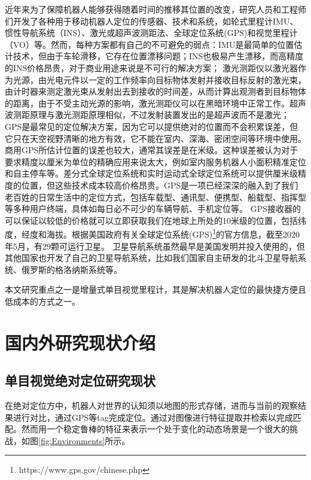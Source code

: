 近年来为了保障机器人能够获得随着时间的推移其位置的改变，研究人员和工程师们开发了各种用于移动机器人定位的传感器、技术和系统，如轮式里程计IMU、惯性导航系统（INS）、激光或超声波测距法、全球定位系统(GPS)和视觉里程计（VO）等。然而，每种方案都有自己的不可避免的弱点：IMU是最简单的位置估计技术，但由于车轮滑移，它存在位置漂移问题\cite{2005Visual}；INS也极易产生漂移，而高精度的INS价格昂贵，对于商业用途来说是不可行的解决方案；
激光测距仪以激光器作为光源，由光电元件以一定的工作频率向目标物体发射并接收目标反射的激光束，由计时器来测定激光束从发射出去到接收的时间差，从而计算出观测者到目标物体的距离，由于不受主动光源的影响，激光测距仪可以在黑暗环境中正常工作。超声波测距原理与激光测距原理相似，不过发射装置发出的是超声波而不是激光；GPS是最常见的定位解决方案，因为它可以提供绝对的位置而不会积累误差，但它只在天空视野清晰的地方有效，它不能在室内、深海、密闭空间等环境中使用\cite{2011Combined}。商用GPS所估计位置的误差也较大，通常其误差是在米级。这种误差被认为对于要求精度以厘米为单位的精确应用来说太大，例如室内服务机器人小面积精准定位和自主停车等。差分式全球定位系统和实时运动式全球定位系统可以提供厘米级精度的位置，但这些技术成本较高价格昂贵。GPS是一项已经深深的融入到了我们老百姓的日常生活中的定位方式，包括车载型、通讯型、便携型、船载型、指挥型等多种用户终端，具体如每日必不可少的车辆导航、手机定位等。%
GPS接收器的可以保证以较低的价格就可以立即获取我们在地球上所处的10米级的位置，包括纬度，经度和海拔。根据美国政府有关全球定位系统(GPS)\footnote{https://www.gps.gov/chinese.php}的官方信息，截至2020年5月，有29颗可运行卫星。
卫星导航系统虽然最早是美国发明并投入使用的，但其他国家也开发了自己的卫星导航系统，比如我们国家自主研发的北斗卫星导航系统、俄罗斯的格洛纳斯系统等。%

本文研究重点之一是增量式单目视觉里程计，其是解决机器人定位的最快捷方便且低成本的方式之一。
\section{国内外研究现状介绍}
\subsection{单目视觉绝对定位研究现状}
在绝对定位方中，机器人对世界的认知须以地图的形式存储，进而与当前的观察结果进行对比，通过GPS等tag完成定位。通过对图像进行特征提取并检索以完成匹配。然而用一个稳定鲁棒的特征来表示一个处于变化的动态场景是一个很大的挑战，如图\ref{fig:Environments}所示。


